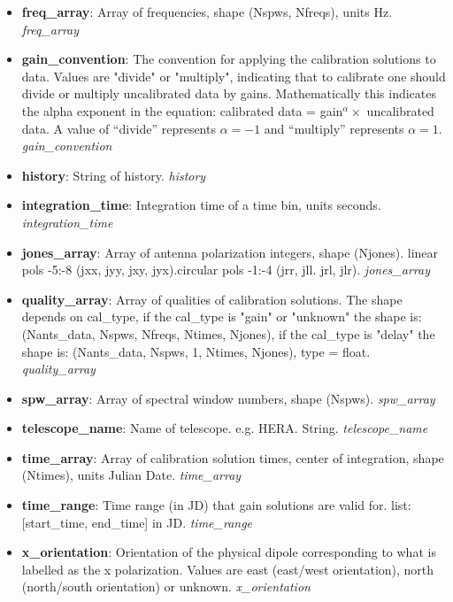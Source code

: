 \documentclass[11pt, oneside]{article}   	%
\begin{document}
\begin{itemize}
\item{\textbf{freq\_array}: Array of frequencies, shape (Nspws, Nfreqs), units
    Hz. \emph{freq\_array}}
\item{\textbf{gain\_convention}: The convention for applying the calibration solutions to data.
    Values are "divide" or "multiply", indicating that to calibrate one should divide or multiply
    uncalibrated data by gains. Mathematically this indicates the alpha exponent in the equation: 
    calibrated data = gain$^{\alpha} \times $ uncalibrated data. A value of
    ``divide'' represents $\alpha=-1$ and ``multiply'' represents $\alpha=1$. \emph{gain\_convention}}
\item{\textbf{history}: String of history. \emph{history}}
\item{\textbf{integration\_time}: Integration time of a time bin, units seconds. \emph{integration\_time}}
\item{\textbf{jones\_array}: Array of antenna polarization integers, shape
    (Njones). linear pols -5:-8 (jxx, jyy, jxy, jyx).circular pols -1:-4 (jrr,
    jll. jrl, jlr). \emph{jones\_array}}
\item{\textbf{quality\_array}: Array of qualities of calibration solutions. The
    shape depends on cal\_type, if the cal\_type is "gain" or "unknown" the shape is:
    (Nants\_data, Nspws, Nfreqs, Ntimes, Njones), if the cal\_type is "delay" the shape is: 
    (Nants\_data, Nspws, 1, Ntimes, Njones), type = float. \emph{quality\_array}}
\item{\textbf{spw\_array}: Array of spectral window numbers, shape (Nspws). \emph{spw\_array}}
\item{\textbf{telescope\_name}: Name of telescope. e.g. HERA. String. \emph{telescope\_name}}
\item{\textbf{time\_array}: Array of calibration solution times, center of integration, shape
    (Ntimes), units Julian Date. \emph{time\_array}}
\item{\textbf{time\_range}: Time range (in JD) that gain solutions are valid
    for. list: [start\_time, end\_time] in JD. \emph{time\_range}}
\item{\textbf{x\_orientation}: Orientation of the physical dipole corresponding
    to what is labelled as the x polarization. Values are east (east/west
    orientation), north (north/south orientation) or unknown. \emph{x\_orientation}}
\end{itemize}
\end{document}
